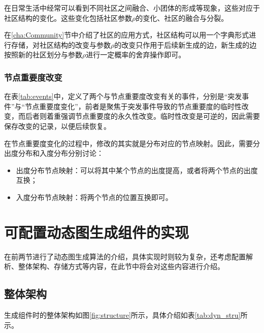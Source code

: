 在日常生活中经常可以看到不同社区之间融合、小团体的形成等现象，这些对应于社区结构的变化。这些变化包括社区参数$\rho$的变化、社区的融合与分裂。

在\ref{cha:Community}节中介绍了社区的应用方式，社区结构可以用一个字典形式进行存储，对社区结构的改变与参数$\rho$的改变只作用于后续新生成的边，新生成的边按照新的社区划分与参数$\rho$进行一定概率的舍弃操作即可。

\subsubsection{节点重要度改变}

在表\ref{tab:events}中，定义了两个与节点重要度改变有关的事件，分别是“突发事件”与“节点重要度变化”，前者是聚焦于突发事件导致的节点重要度的临时性改变，而后者则着重强调节点重要度的永久性改变。临时性改变是可逆的，因此需要保存改变的记录，以便后续恢复。

在节点重要度变化的过程中，修改的其实就是分布对应的节点映射。因此，需要分出度分布和入度分布分别讨论：

\begin{itemize}
  \item 出度分布节点映射：可以将其中某个节点的出度提高，或者将两个节点的出度互换；
  \item 入度分布节点映射：将两个节点的位置互换即可。
\end{itemize}

\vspace{0.2cm}

\section{可配置动态图生成组件的实现}
\label{cha:tool_implementation}

在前两节进行了动态图生成算法的介绍，具体实现时则较为复杂，还考虑配置解析、整体架构、存储方式等内容，在此节中将会对这些内容进行介绍。

\subsection{整体架构}

生成组件时的整体架构如图\ref{fig:structure}所示，具体介绍如表\ref{tab:dyn_stru}所示。

